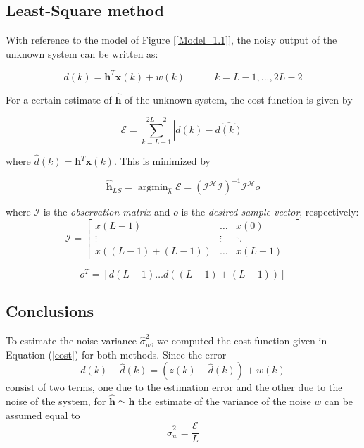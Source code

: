 \documentclass[a4paper, 12pt]{report}
\DeclareMathOperator*{\argmin}{argmin}
\begin{document}
\subsection*{Least-Square method}
With reference to the model of Figure [\ref{Model_1.1}], the noisy output of the unknown system can be written as:

\begin{equation*}
d(k) = \mathbf{h}^T\mathbf{x}(k)+w(k) \quad\quad\quad k=L-1,...,2L-2
\end{equation*}

For a certain estimate of \textbf{$\mathbf{\hat{h}}$} of the unknown system, the cost function is given by

\begin{equation}\label{cost}
\mathcal{E} = \sum_{k=L-1}^{2L-2}|d(k)-\hat{d(k)}|
\end{equation}

where $\hat{d}(k)=\mathbf{h}^T\mathbf{x}(k)$. This is minimized by 

\begin{equation}
\mathbf{\hat{h}}_{LS} = \argmin_{\hat{h}} \mathcal{E} = (\mathcal{I^HI})^{-1}\mathcal{I^H}o 
\end{equation}

where $\mathcal{I}$ is the \textit{observation matrix} and $o$ is the \textit{desired sample vector}, respectively:
\begin{equation*}
\mathcal{I} = \begin{bmatrix}
x(L-1) & \dots & x(0) \\
\vdots & \vdots & \ddots & \\
x((L-1)+(L-1)) &  \dots & x(L-1)
\end{bmatrix}
\end{equation*}

\begin{equation*}
o^T = [d(L-1) \dots d((L-1)+(L-1))]
\end{equation*}


\subsection*{Conclusions}
To estimate the noise variance $\hat{\sigma}_w^2$, we computed the cost function given in Equation (\ref{cost}) for both methods. Since the error
\begin{equation*}
d(k) - \hat{d}(k) = (z(k)-\hat{d}(k))+w(k)
\end{equation*}
consist of two terms, one due to the estimation error and the other due to the noise of the system, for $\mathbf{\hat{h}}\simeq\mathbf{h}$ the estimate of the variance of the noise $w$ can be assumed equal to 
\begin{equation*}
\hat{\sigma}_w^2 = \frac{\mathcal{E}}{L}
\end{equation*} 
\end{document}
